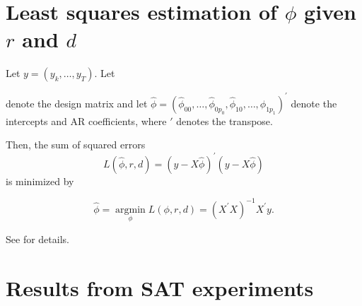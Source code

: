 \documentclass{article}
\DeclareMathOperator*{\argmin}{argmin}
\begin{document}



\appendix
 
\section{Least squares estimation of $\phi$ given $r$ and $d$}
\label{app:estimation}

Let $y = (y_k, \dots, y_T)$.
Let
\begin{center}
\end{center}


denote the design matrix and let
$\hat{\phi} = (\hat{\phi}_{00}, \dots, \hat{\phi}_{0 p_0}, \hat{\phi}_{10}, \dots, \hat{\phi}_{1 p_1})^\prime$
denote the intercepts and AR coefficients, where $\prime$ denotes the transpose.

Then, the sum of squared errors 
$$L(\hat{\phi}, r, d) = (y - X \hat{\phi})^\prime (y - X \hat{\phi})$$
is minimized by

$$\hat{\phi} = \argmin\limits_{\phi} L(\phi, r, d) = 
(X^\prime X)^{-1} X^\prime y.$$

See \citet{bar2} for details.

\newpage
\section{Results from SAT experiments}
\label{app:results_SAT}



\end{document}
